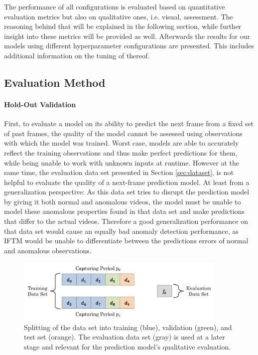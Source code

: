 The performance of all configurations is evaluated based on quantitative evaluation metrics but also on qualitative ones, i.e. visual, assessment. The reasoning behind that will be explained in the following section, while further insight into these metrics will be provided as well. Afterwards the results for our models using different hyperparameter configurations are presented. This includes additional information on the tuning of thereof.


\subsection{Evaluation Method} \label{subsec:cvgan_eval_method} %

\paragraph{Hold-Out Validation}
First, to evaluate a model on its ability to predict the next frame from a fixed set of past frames, the quality of the model cannot be assessed using observations with which the model was trained. Worst case, models are able to accurately reflect the training observations and thus make perfect predictions for them, while being unable to work with unknown inputs at runtime. However at the same time, the evaluation data set presented in Section \ref{sec:dataset}, is not helpful to evaluate the quality of a next-frame prediction model. At least from a generalization perspective: As this data set tries to disrupt the prediction model by giving it both normal and anomalous videos, the model must be unable to model these anomalous properties found in that data set and make predictions that differ to the actual videos. Therefore a good generalization performance on that data set would cause an equally bad anomaly detection performance, as IFTM would be unable to differentiate between the predictions errors of normal and anomalous observations.  

\begin{figure}
	\centering
	\includegraphics[width=0.9\textwidth]{graphics/eval/evalSplit/evalSplit.pdf}
  \caption[Splitting of the data set for evaluation.]{Splitting of the data set into training (blue), validation (green), and test set (orange). The evaluation data set (gray) is used at a later stage and relevant for the prediction model's qualitative evaluation.}
  \label{fig:dataset_split}
\end{figure}


